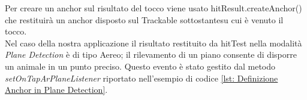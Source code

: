 \documentclass[crop=false, class=book]{standalone}
\begin{document}
	\begin{flushleft}
		Per creare un anchor sul risultato del tocco viene usato hitResult.createAnchor() che restituirà un anchor disposto sul 		Trackable sottostantesu cui è venuto il tocco.\\
		Nel caso della nostra applicazione il risultato restituito da hitTest nella modalità \emph{Plane Detection} è di tipo 			Aereo; il rilevamento di un piano consente di disporre un animale in un punto preciso. Questo evento è stato 					gestito dal metodo \textit{setOnTapArPlaneListener} riportato nell'esempio di codice \vref{lst: Definizione Anchor in 			Plane Detection}.\\
	\end{flushleft}
	
	
			
	
\end{document}
